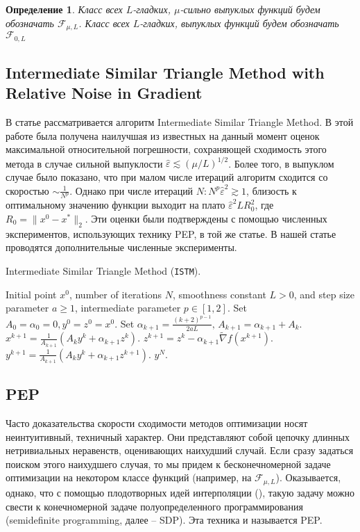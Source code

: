 \documentclass{article}
\newtheorem{Def}{Определение}[section]
\begin{document}
\begin{Def}
Класс всех $L$-гладких, $\mu$-сильно выпуклых функций будем обозначать $\mathcal{F}_{\mu, L}$. Класс всех $L$-гладких, выпуклых функций будем обозначать $\mathcal{F}_{0, L}$
\end{Def}

\subsection{Intermediate Similar Triangle Method with Relative Noise in Gradient}

В статье \cite{kornilov2023intermediate} рассматривается алгоритм Intermediate Similar Triangle Method. В этой работе была получена наилучшая из известных на данный момент оценок максимальной относительной погрешности, сохраняющей сходимость этого метода в случае сильной выпуклости $\hat{\varepsilon} \lesssim (\mu / L)^{1/2}$. Более того, в выпуклом случае было показано, что при малом числе итераций алгоритм сходится со скоростью $\sim \frac{1}{N^p}$. Однако при числе итераций $N: N^p \hat{\varepsilon}^2 \gtrsim 1$, близость к оптимальному значению функции выходит на плато $\hat{\varepsilon}^2 L R_0^2$, где $R_0 = \|x^0 - x^*\|_2$.  Эти оценки были подтверждены с помощью численных экспериментов, использующих технику PEP, в той же статье. В нашей статье проводятся дополнительные численные эксперименты.

\begin{algorithm}[!ht]
\caption{ Intermediate  Similar Triangle Method (\texttt{ISTM}).}\label{alg_STM_relative}
\begin{algorithmic}[1]
   \REQUIRE Initial point $x^0$, number of iterations $N$, smoothness constant  $L>0$, and step size parameter $a \geq 1$, intermediate parameter $p \in [1,2]$. 
   \STATE Set $A_0 = \alpha_0 = 0, y^0 = z^0 = x^0$.
   \STATE Set $\alpha_{k+1} = \frac{(k+2)^{p-1}}{2aL}, \, A_{k+1} = \alpha_{k+1} + A_k$. \label{item_3}
   \STATE $x^{k+1} = \frac{1}{A_{k+1}} \left(A_k y^k + \alpha_{k+1} z^k\right) $. \label{item_4}
   \STATE $z^{k+1} = z^k - \alpha_{k+1} \widetilde{\nabla} f(x^{k+1})$.
   \STATE $y^{k+1} = \frac{1}{A_{k+1}} \left(A_k y^k + \alpha_{k+1} z^{k+1}\right)$.
   \ENDFOR
    \ENSURE 
	$y^N$.
\end{algorithmic}
\end{algorithm}

\subsection{PEP}
Часто доказательства скорости сходимости методов оптимизации носят неинтуитивный, техничный характер. Они представляют собой цепочку длинных нетривиальных неравенств, оценивающих наихудший случай. Если сразу задаться поиском этого наихудшего случая, то мы придем к бесконечномерной задаче оптимизации на некотором классе функций (например, на $\mathcal{F}_{\mu, L}$). Оказывается, однако, что с помощью плодотворных идей интерполяции (\cite{taylor2017smooth}), такую задачу можно свести к конечномерной задаче полуопределенного программирования (semidefinite programming, далее -- SDP). Эта техника и называется PEP. 
\end{document}
